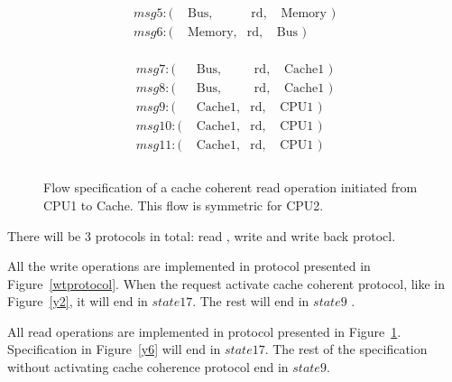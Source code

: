 \documentclass[12pt,frontmatter,copyright,thesis]{usfmanus}
\begin{document}
\begin{appendix}
\begin{figure}[h]
\begin{minipage}{.5\textwidth}
{\[\begin{array}{llll}
 msg5: (&\mbox{ Bus},&\mbox{ rd},&\mbox{ Memory     })\\ 
 msg6: (&\mbox{ Memory},&\mbox{rd},&\mbox{Bus     })\\
 \end{array}
 \]}
 \end{minipage}%
 \begin{minipage}{.5\textwidth}
 {\footnotesize
 \[
 \begin{array}{llll}
 msg7: (&\mbox{ Bus},&\mbox{ rd},&\mbox{ Cache1 })\\
 msg8: (&\mbox{ Bus},&\mbox{ rd},&\mbox{ Cache1 })\\
 msg9: (&\mbox{ Cache1},&\mbox{rd},&\mbox{CPU1       })\\
 msg10: (&\mbox{ Cache1},&\mbox{rd},&\mbox{CPU1       })\\
 msg11: (&\mbox{ Cache1},&\mbox{rd},&\mbox{CPU1       })\\\\
 \end{array}
 \]}
 \end{minipage}
 \caption{\footnotesize Flow specification of a cache coherent read operation initiated from CPU1 to Cache. \footnotesize This flow is symmetric for CPU2. }
 \label{readprotocol}
 \end{figure}
 
 
There will be 3 protocols in total: read , write and write back protocl.

All the write operations are implemented in protocol presented in Figure~\ref{wtprotocol}.
When the request activate cache coherent protocol, like in Figure~\ref{y2}, it will end in $state 17$. The rest will end in $state 9$ .


All read operations are implemented in protocol presented in Figure~\ref{readprotocol}. Specification in Figure~\ref{y6} will end in $state 17$. 
The rest of the specification without activating cache coherence protocol end in $state 9$.

\end{appendix}


\begin{spacing}{1}


\end{spacing}
\end{document}
